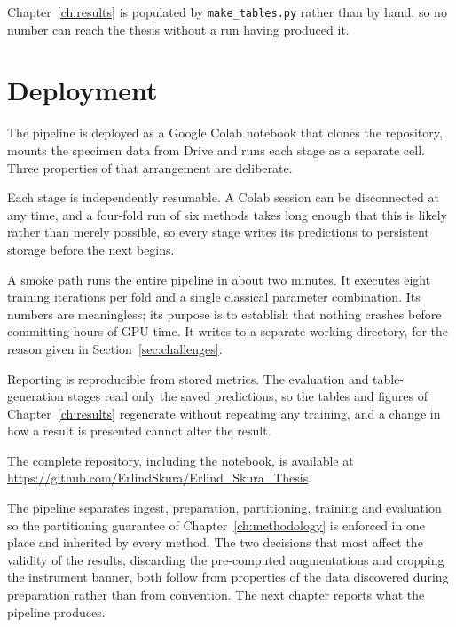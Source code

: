 Chapter~\ref{ch:results} is populated by \texttt{make\_tables.py} rather than by
hand, so no number can reach the thesis without a run having produced it.

\section{Deployment}
\label{sec:deployment}

The pipeline is deployed as a Google Colab notebook that clones the repository,
mounts the specimen data from Drive and runs each stage as a separate cell. Three
properties of that arrangement are deliberate.

Each stage is independently resumable. A Colab session can be
disconnected at any time, and a four-fold run of six methods takes long enough
that this is likely rather than merely possible, so every stage writes its
predictions to persistent storage before the next begins.

A smoke path runs the entire pipeline in about two minutes. It executes
eight training iterations per fold and a single classical parameter combination.
Its numbers are meaningless; its purpose is to establish that nothing crashes
before committing hours of GPU time. It writes to a separate working directory,
for the reason given in Section~\ref{sec:challenges}.

Reporting is reproducible from stored metrics. The evaluation and
table-generation stages read only the saved predictions, so the tables and figures
of Chapter~\ref{ch:results} regenerate without repeating any training, and a
change in how a result is presented cannot alter the result.

The complete repository, including the notebook, is available at
\url{https://github.com/ErlindSkura/Erlind_Skura_Thesis}.

The pipeline separates ingest, preparation, partitioning, training and evaluation
so the partitioning guarantee of Chapter~\ref{ch:methodology} is enforced in one
place and inherited by every method. The two decisions that most affect the
validity of the results, discarding the pre-computed augmentations and cropping
the instrument banner, both follow from properties of the data discovered during
preparation rather than from convention. The next chapter reports what the
pipeline produces.
